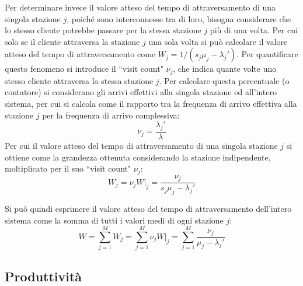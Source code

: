 \documentclass{article}
\numberwithin{equation}{subsection}
\begin{document}
Per determinare invece il valore atteso del tempo di attraversamento di una singola stazione $j$, poiché sono interconnesse tra di loro, bisogna considerare che lo stesso 
cliente potrebbe passare per la stessa stazione $j$ più di una volta. Per cui solo se il cliente attraversa la stazione $j$ una sola volta si può calcolare 
il valore atteso del tempo di attraversamento come $W_j=1/(s_j\mu_j-\lambda_j')$. Per quantificare questo fenomeno si introduce il ``visit count" $\nu_j$, che indica quante volte 
uno stesso cliente attraversa la stessa stazione $j$. Per calcolare questa percentuale (o contatore) si considerano gli arrivi effettivi alla singola stazione ed all'intero 
sistema, per cui si calcola come il rapporto tra la frequenza di arrivo effettiva alla stazione $j$ per la frequenza di arrivo complessiva:
\begin{equation}
    \nu_j=\displaystyle\frac{\lambda_j'}{\lambda}
\end{equation}
Per cui il valore atteso del tempo di attraversamento di una singola stazione $j$ si ottiene come la grandezza ottenuta considerando la stazione indipendente, moltiplicato 
per il suo ``visit count" $\nu_j$:
\begin{equation}
    W_j=\nu_jW\big|_j=\displaystyle\frac{\nu_j}{s_j\mu_j-\lambda_j'}
\end{equation}

Si può quindi esprimere il valore atteso del tempo di attraversamento dell'intero sistema come la somma di tutti i valori medi di ogni stazione $j$:
\begin{equation}
    W=\displaystyle\sum_{j=1}^MW_j=\sum_{j=1}^M\nu_jW\big|_j=\sum_{j=1}^M\frac{\nu_j}{\mu_j-\lambda_j'}
\end{equation}

\subsection{Produttività}
\end{document}
